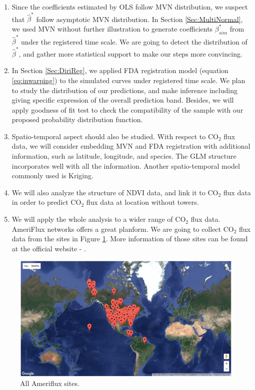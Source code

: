 \documentclass{article}\usepackage[]{graphicx}\usepackage[]{color}
\newcommand{\MYhref}[3][blue]{\href{#2}{\color{#1}{#3}}}%
\begin{document}
\begin{enumerate}

\item Since the coefficients estimated by OLS follow MVN distribution, we suspect that $\widehat{\beta}^{*}$ follow asymptotic MVN distribution. In Section \ref{Sec:MultiNormal}, we used MVN without further illustration to generate coefficients $\beta^{*}_{sim}$  from $\widehat{\beta}^{*}$ under the registered time scale. We are going to detect the distribution of $\widehat{\beta}^{*}$, and gather more statistical support to make our steps more convincing. 

\item In Section \ref{Sec:DiriReg}, we applied FDA registration model (equation \ref{eq:inwarping}) to the simulated curves under registered time scale. We plan to study the distribution of our predictions, and make inference including giving specific expression of the overall prediction band. Besides, we will apply goodness of fit test to check the compatibility of the sample with our proposed probability distribution function.

\item Spatio-temporal aspect should also be studied. With respect to CO$_2$ flux data, we will consider embedding MVN and FDA registration with additional information, such as latitude, longitude, and species.  The GLM structure incorporates well with all the information. Another spatio-temporal model commonly used is Kriging.

\item We will also analyze the structure of NDVI data, and link it to CO$_2$ flux data in order to predict CO$_2$ flux data at location without towers.

\item We will apply the whole analysis to a wider range of CO$_2$ flux data.  AmeriFlux networks offers a great planform. We are going to collect CO$_2$ flux data from the sites in Figure \ref{Fig:AllSites}. More information of those sites can be found at the official website - \MYhref[brown]{http://ameriflux.lbl.gov/sites/site-list-and-pages/}{AmeriFlux Site List}.

\end{enumerate}


\begin{figure}[!ht]
\centering
\includegraphics[width=14cm]{AllSites.png}
\caption{All Ameriflux sites.}
\label{Fig:AllSites}
\end{figure}
\end{document}

